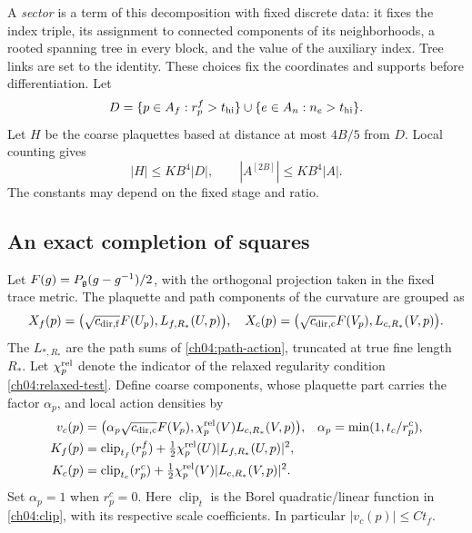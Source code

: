 A \emph{sector} is a term of this decomposition with fixed discrete data: it fixes the index triple, its assignment to connected
components of its neighborhoods, a rooted spanning tree in every block,
and the value of the auxiliary index. Tree links are set to the identity.
These choices fix the coordinates and supports before differentiation.
Let
\[
 D=\{p\in A_f:r_p^f>t_{\rm hi}\}\cup\{e\in A_n:n_e>t_{\rm hi}\}.
\]
Let $H$ be the coarse plaquettes based at distance at most $4B/5$ from $D$. Local
counting gives
\begin{equation}
 |H|\le K B^4|D|,\qquad |A^{[2B]}|\le K B^4|A|.
 \label{ch06:counts}
\end{equation}
The constants may depend on the fixed stage and ratio.

\subsection{An exact completion of squares}

Let $F(g)=P_{\mathfrak g}(g-g^{-1})/2$, with the orthogonal projection taken in
the fixed trace metric. The plaquette and path components of the curvature are grouped as
\[
 X_f(p)=\bigl(\sqrt{c_{\rm dir,f}}F(U_p),L_{f,R_*}(U,p)\bigr),
 \quad
 X_c(p)=\bigl(\sqrt{c_{\rm dir,c}}F(V_p),L_{c,R_*}(V,p)\bigr).
\]
The $L_{*,R_*}$ are the path sums of \eqref{ch04:path-action}, truncated
at true fine length $R_*$. Let $\chi_p^{\rm rel}$ denote the indicator of the relaxed
regularity condition \eqref{ch04:relaxed-test}. Define coarse components, whose plaquette part carries the factor $\alpha_p$,
and local action densities by
\begin{align*}
 v_c(p)&=\bigl(\alpha_p\sqrt{c_{\rm dir,c}}F(V_p),
                   \chi_p^{\rm rel}(V)L_{c,R_*}(V,p)\bigr),
 &\alpha_p&=\min(1,t_c/r_p^c),\\
 K_f(p)&=\operatorname{clip}_{t_f}(r_p^f)
                  +\tfrac12\chi_p^{\rm rel}(U)|L_{f,R_*}(U,p)|^2,\\
 K_c(p)&=\operatorname{clip}_{t_c}(r_p^c)
                  +\tfrac12\chi_p^{\rm rel}(V)|L_{c,R_*}(V,p)|^2.
\end{align*}
Set $\alpha_p=1$ when $r_p^c=0$. Here $\operatorname{clip}_t$ is the Borel quadratic/linear
function in \eqref{ch04:clip}, with its respective scale coefficients.
In particular $|v_c(p)|\le Ct_f$.

